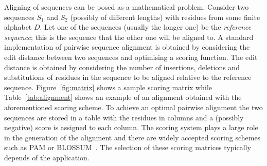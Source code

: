 
Aligning of sequences can be posed as a mathematical problem. Consider two sequences $S_1$ and $S_2$ (possibly of different lengths) with residues from some finite alphabet $D$. Let one of the sequences (usually the longer one) be the \textit{reference sequence}; this is the sequence that the other one will be aligned to.
A standard implementation of pairwise sequence alignment is obtained by considering the edit distance between two sequences and optimising a scoring function. The edit distance is obtained by considering the number of insertions, deletions and substitutions of residues in the sequence to be aligned relative to the reference sequence. Figure~\ref{fig:matrix} shows a sample scoring matrix while Table~\ref{tab:alignment} shows an example of an alignment obtained with the aforementioned scoring scheme. To achieve an optimal pairwise alignment the two sequences are stored in a table with the residues in columns and a (possibly negative) score is assigned to each column. %
The scoring system plays a large role in the generation of the alignment and there are widely accepted scoring schemes such as PAM or BLOSSUM~\cite{mount2008comparison}. The selection of these scoring matrices typically depends of the application. 

